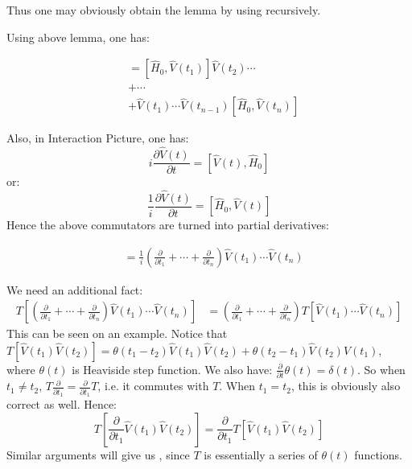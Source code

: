 \documentclass{article}
\numberwithin{equation}{subsection} %
\begin{document}
Thus one may obviously obtain the lemma by using  recursively.

Using above lemma, one has:

\begin{align}
[\hat{H}_0,\hat{V}(t_1)\dotsb\hat{V}(t_n)] &= [\hat{H}_0,\hat{V}(t_1)]\hat{V}(t_2)\dotsb \nonumber\\
&+ \dotsb \nonumber \\
&+ \hat{V}(t_1)\dotsb\hat{V}(t_{n-1})[\hat{H}_0,\hat{V}(t_n)] 
\end{align}

Also, in Interaction Picture, one has:
$$ i\frac{\partial \hat{V}(t)}{\partial t} = [\hat{V}(t),\hat{H}_0]$$
or:
$$ \frac{1}{i} \frac{\partial \hat{V}(t)}{\partial t} = [\hat{H}_0,\hat{V}(t)]$$
Hence the above commutators are turned into partial derivatives:

\begin{align}
[\hat{H}_0,\hat{V}(t_1)\dotsb\hat{V}(t_n)] &= \frac{1}{i} \left( \frac{\partial}{\partial t_1} + \dotsb + \frac{\partial}{\partial t_n}  \right)  \hat{V}(t_1)\dotsb\hat{V}(t_{n})
\label{eq:eq_of_HVVV}
\end{align}

We need an additional fact:
\begin{align}
T[\left( \frac{\partial}{\partial t_1} + \dotsb + \frac{\partial}{\partial t_n}  \right)  \hat{V}(t_1)\dotsb\hat{V}(t_{n})] &= \left( \frac{\partial}{\partial t_1} + \dotsb + \frac{\partial}{\partial t_n}  \right)  T [\hat{V}(t_1)\dotsb\hat{V}(t_{n})]
\label{eq:partial_T}
\end{align}
This can be seen on an example. Notice that 
$T[\hat{V}(t_1)\hat{V}(t_2)] = \theta(t_1-t_2)\hat{V}(t_1)\hat{V}(t_2) + \theta(t_2-t_1)\hat{V}(t_2)\hat{V}(t_1)$, where $\theta(t)$ is Heaviside step function. We also have: $\frac{\partial}{\partial t}\theta(t) = \delta(t) $. So when $t_1\neq t_2$, $T\frac{\partial}{\partial t_1} = \frac{\partial}{\partial t_1} T$, i.e. it commutes with $T$. When $t_1 = t_2$, this is obviously also correct as well. Hence:
$$
T[ \frac{\partial}{\partial t_1} \hat{V}(t_1) \hat{V}(t_{2})] = 
\frac{\partial}{\partial t_1} T[  \hat{V}(t_1) \hat{V}(t_{2})]
$$
Similar arguments will give us , since $T$ is essentially a series of $\theta(t)$ functions.
\end{document}

